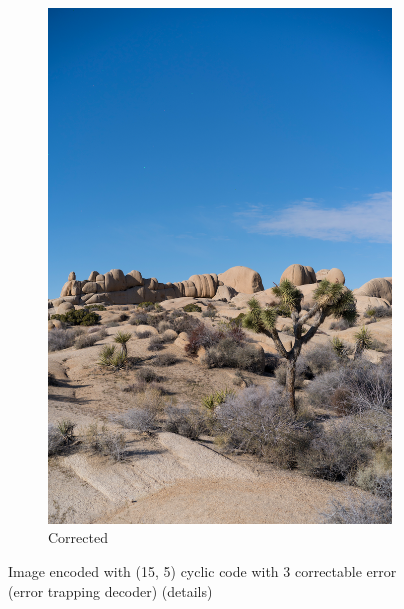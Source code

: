 \documentclass{article}
\begin{document}
\begin{figure}[htb]
\begin{subfigure}[b]{0.32\textwidth}
        \includegraphics[width=\textwidth]{../Result/Cyclic/15-5/cyclic-bsc-output-trapping-corrected.png}
        \caption{Corrected}
        \label{fig:image-cyclic-15-5-trapping-corrected}
    \end{subfigure}
       \caption{Image encoded with (15, 5) cyclic code with 3 correctable error (error trapping decoder) (details)}
       \label{fig:image-cyclic-15-5-trapping}
\end{figure}
\end{document}
